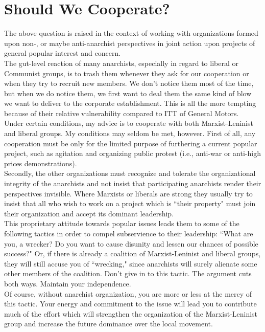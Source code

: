 \chapter{Should We Cooperate?}

The above question is raised in the context of working with organizations formed upon non-, or maybe anti-anarchist perspectives in joint action upon projects of general popular interest and concern.\\
The gut-level reaction of many anarchists, especially in regard to liberal or Communist groups, is to trash them whenever they ask for our cooperation or when they try to recruit new members. We don't notice them most of the time, but when we do notice them, we first want to deal them the same kind of blow we want to deliver to the corporate establishment. This is all the more tempting because of their relative vulnerability compared to ITT of General Motors.\\
Under certain conditions, my advice is to cooperate with both Marxist-Leninist and liberal groups. My conditions may seldom be met, however. First of all, any cooperation must be only for the limited purpose of furthering a current popular project, such as agitation and organizing public protest (i.e., anti-war or anti-high prices demonstrations).\\
Secondly, the other organizations must recognize and tolerate the organizational integrity of the anarchists and not insist that participating anarchists render their perspectives invisible. Where Marxists or liberals are strong they usually try to insist that all who wish to work on a project which is ``their property" must join their organization and accept its dominant leadership.\\
This proprietary attitude towards popular issues leads them to some of the following tactics in order to compel subservience to their leadership: ``What are you, a wrecker? Do you want to cause disunity and lessen our chances of possible success?" Or, if there is already a coalition of Marxist-Leninist and liberal groups, they will still accuse you of ``wrecking," since anarchists will surely alienate some other members of the coalition. Don't give in to this tactic. The argument cuts both ways. Maintain your independence.\\
Of course, without anarchist organization, you are more or less at the mercy of this tactic. Your energy and commitment to the issue will lead you to contribute much of the effort which will strengthen the organization of the Marxist-Leninist group and increase the future dominance over the local movement.\\
